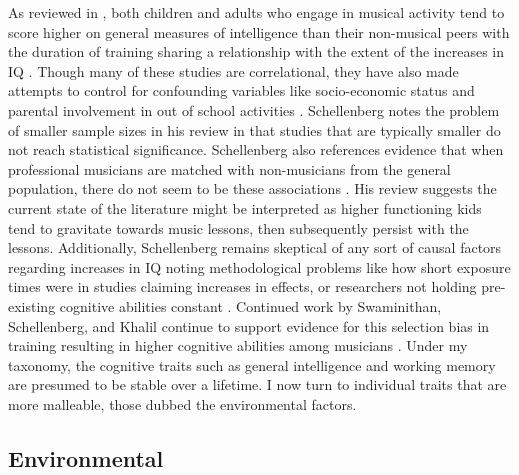 \documentclass[12pt,]{book}
\begin{document}
As reviewed in \citet{schellenbergMusicNonmusicalAbilities2017}, both children and adults who engage in musical activity tend to score higher on general measures of intelligence than their non-musical peers \citep{gibsonEnhancedDivergentThinking2009, hilleAssociationsMusicEducation2011, schellenbergExaminingAssociationMusic2011, schellenbergMusicTrainingEmotion2012} with the duration of training sharing a relationship with the extent of the increases in IQ \citep{corrigallPredictingWhoTakes2015, degeMusicLessonsIntelligence2011, schellenbergLongtermPositiveAssociations2006}.
Though many of these studies are correlational, they have also made attempts to control for confounding variables like socio-economic status and parental involvement in out of school activities \citep{corrigallAssociationsLengthMusic2011, degeMusicLessonsIntelligence2011, schellenbergExaminingAssociationMusic2011, schellenbergMusicTrainingEmotion2012}.
Schellenberg notes the problem of smaller sample sizes in his review \citep{corrigallAssociationsLengthMusic2011, parbery-clarkMusicalExperienceAging2011, straitMusicalTrainingEarly2012} in that studies that are typically smaller do not reach statistical significance.
Schellenberg also references evidence that when professional musicians are matched with non-musicians from the general population, there do not seem to be these associations \citep{schellenbergLongtermPositiveAssociations2006}.
His review suggests the current state of the literature might be interpreted as higher functioning kids tend to gravitate towards music lessons, then subsequently persist with the lessons.
Additionally, Schellenberg remains skeptical of any sort of causal factors regarding increases in IQ \citep{francoisMusicTrainingDevelopment2013, morenoMusicalTrainingInfluences2009} noting methodological problems like how short exposure times were in studies claiming increases in effects, or researchers not holding pre-existing cognitive abilities constant \citep{mehrTwoRandomizedTrials2013}.
Continued work by Swaminithan, Schellenberg, and Khalil continue to support evidence for this selection bias in training resulting in higher cognitive abilities among musicians \citep{swaminathanRevisitingAssociationMusic2017}.
Under my taxonomy, the cognitive traits such as general intelligence and working memory are presumed to be stable over a lifetime.
I now turn to individual traits that are more malleable, those dubbed the environmental factors.

\hypertarget{environmental}{%
\subsection{Environmental}\label{environmental}}
\end{document}

